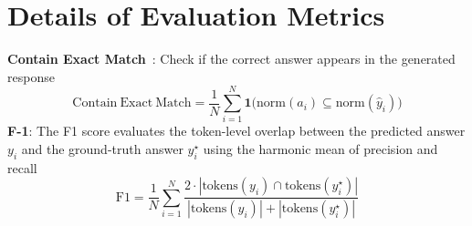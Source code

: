 \section{Details of Evaluation Metrics}
\label{app:eval_metric}
\noindent\textbf{Contain Exact Match}~\cite{zhuang2025linearrag}: Check if the correct answer appears in the generated response
\[
\mathrm{Contain\ Exact\ Match}=\frac{1}{N}\sum_{i=1}^{N}\mathbf{1}\big(\mathrm{norm}(a_i)\subseteq \mathrm{norm}(\hat{y}_i)\big)
\]
\noindent\textbf{F-1}: The F1 score evaluates the token-level overlap between the predicted answer $y_i$ and the ground-truth answer $y_i^\star$ using the harmonic mean of precision and recall
\[
\mathrm{F1}=\frac{1}{N}\sum_{i=1}^{N}
\frac{2\cdot\left|\mathrm{tokens}(y_i)\cap \mathrm{tokens}(y_i^\star)\right|}
{\left|\mathrm{tokens}(y_i)\right|+\left|\mathrm{tokens}(y_i^\star)\right|}
\]
